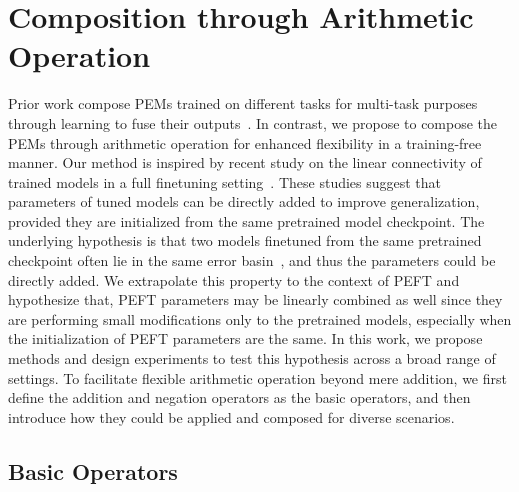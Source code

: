 \section{Composition through Arithmetic Operation}
\label{sec:definition}
Prior work compose PEMs trained on different tasks for multi-task purposes through learning to fuse their outputs~\citep{pfeiffer2021adapterfusion,wang2022adamix}.
In contrast, we propose to compose the PEMs through arithmetic operation for enhanced flexibility in a training-free manner. 
Our method is inspired by recent study on the linear connectivity of trained models in a full finetuning setting~\citep{wortsman2022model,matena2022merging,ainsworth2022git,jin2022dataless}.
These studies suggest that parameters of tuned models can be directly added to improve generalization, provided they are initialized from the same pretrained model checkpoint.
The underlying hypothesis is that two models finetuned from the same pretrained checkpoint often lie in the same error basin~\citep{NEURIPS2020_0607f4c7}, and thus the parameters could be directly added. 
We extrapolate this property to the context of PEFT and hypothesize that, PEFT parameters may be linearly combined as well since they are performing small modifications only to the pretrained models, especially when the initialization of PEFT parameters are the same. 
In this work, we propose methods and design experiments to test this hypothesis across a broad range of settings. 
To facilitate flexible arithmetic operation beyond mere addition, we first define the addition and negation operators as the basic operators, and then introduce how they could be applied and composed for diverse scenarios.


\subsection{Basic Operators}



